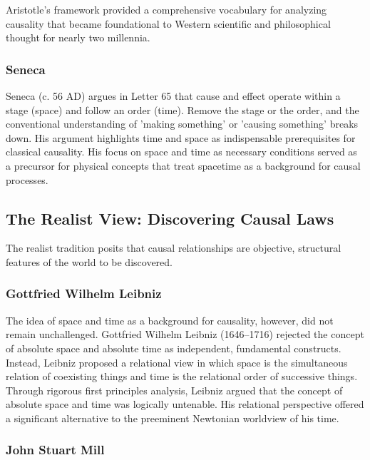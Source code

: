Aristotle’s framework provided a comprehensive vocabulary for analyzing causality that became foundational to Western scientific and philosophical thought for nearly two millennia.

\subsubsection{Seneca}
\label{sec:history_seneca}

Seneca (c. 56 AD) argues in Letter 65\cite{SenecaLetters} that cause and effect operate within a stage (space) and follow an order (time). Remove the stage or the order, and the conventional understanding of 'making something' or 'causing something' breaks down. His argument highlights time and space as indispensable prerequisites for classical causality. His focus on space and time as necessary conditions served as a precursor for physical concepts that treat spacetime as a background for causal processes.

\subsection{The Realist View: Discovering Causal Laws}
\label{ssec:philosophy_realist}

The realist tradition posits that causal relationships are objective, structural features of the world to be discovered.

\subsubsection{Gottfried Wilhelm Leibniz}
\label{sec:history_leibniz}

The idea of space and time as a background for causality, however, did not remain unchallenged. Gottfried Wilhelm Leibniz (1646--1716) rejected the concept of absolute space and absolute time as independent, fundamental constructs. Instead, Leibniz proposed\cite{LeibnizPhysicsSEP} a relational view in which space is the simultaneous relation of coexisting things and time is the relational order of successive things. Through rigorous first principles analysis, Leibniz argued that the concept of absolute space and time was logically untenable. His relational perspective offered a significant alternative to the preeminent Newtonian worldview of his time.

\subsubsection{John Stuart Mill}
\label{sec:history_stuart_mill}

